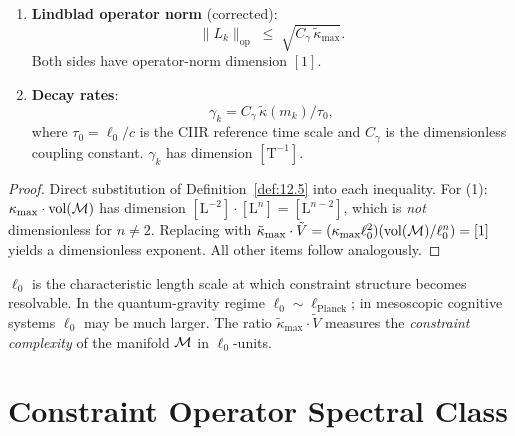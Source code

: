 \begin{theorem}
\begin{enumerate}
  \item \textbf{Lindblad operator norm} (corrected):
  \begin{equation}\label{eq:lindblad-norm}
    \|L_k\|_{\mathrm{op}} \;\leq\; \sqrt{C_\gamma\,\tilde{\kappa}_{\max}}.
  \end{equation}
  Both sides have operator-norm dimension $[1]$.

  \item \textbf{Decay rates}:
  \begin{equation}\label{eq:decay-rates}
    \gamma_k = C_\gamma\,\tilde{\kappa}(m_k) / \tau_0,
  \end{equation}
  where $\tau_0 = \ell_0 / c$ is the CIIR reference time scale and
  $C_\gamma$ is the dimensionless coupling constant.
  $\gamma_k$ has dimension $[\mathrm{T}^{-1}]$.
\end{enumerate}
\end{theorem}

\begin{proof}
Direct substitution of Definition~\ref{def:12.5} into each inequality.
For (1): $\kappa_{\max} \cdot \mathrm{vol}(\mathcal{M})$ has dimension
$[\mathrm{L}^{-2}] \cdot [\mathrm{L}^n] = [\mathrm{L}^{n-2}]$, which
is \emph{not} dimensionless for $n \neq 2$.
Replacing with $\tilde{\kappa}_{\max} \cdot \tilde{V}
= (\kappa_{\max}\ell_0^2)(\mathrm{vol}(\mathcal{M})/\ell_0^n) = [1]$
yields a dimensionless exponent.  All other items follow analogously.
\end{proof}

\begin{remark}
$\ell_0$ is the characteristic length scale at which constraint structure
becomes resolvable.  In the quantum-gravity regime
$\ell_0 \sim \ell_{\mathrm{Planck}}$; in mesoscopic cognitive systems
$\ell_0$ may be much larger.  The ratio $\tilde{\kappa}_{\max} \cdot \tilde{V}$
measures the \emph{constraint complexity} of the manifold $\mathcal{M}$ in
$\ell_0$-units.
\end{remark}

\section{Constraint Operator Spectral Class}
\label{sec:spectral}

